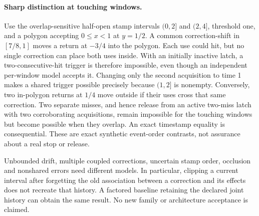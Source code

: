 \documentclass[11pt]{article}
\begin{document}
\paragraph{Sharp distinction at touching windows.}
Use the overlap-sensitive half-open stamp intervals $(0,2]$ and
$(2,4]$, threshold one, and a polygon accepting $0\le x<1$ at
$y=1/2$. A common correction-shift in $[7/8,1]$ moves a return at
$-3/4$ into the polygon. Each use could hit, but no single correction
can place both uses inside. With an initially inactive latch,
a two-consecutive-hit trigger is therefore impossible, even though an
independent per-window model accepts it. Changing only the second
acquisition to time 1 makes a shared trigger possible precisely
because $(1,2]$ is nonempty. Conversely, two in-polygon returns
at $1/4$ move outside if their uses cross that same correction.
Two separate misses, and hence release from an active two-miss
latch with two corroborating acquisitions, remain impossible for the
touching windows but become possible when they overlap. An exact
timestamp equality is consequential. These are exact synthetic
event-order contrasts, not assurance about a real stop or release.

Unbounded drift, multiple coupled corrections, uncertain stamp order,
occlusion and nonshared errors need different models. In particular,
clipping a current interval after forgetting the old association
between a correction and its effects does not recreate that history.
A factored baseline retaining the declared joint history can obtain
the same result. No new family or architecture acceptance is claimed.
\end{document}
